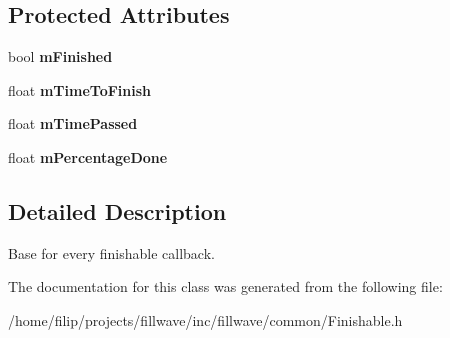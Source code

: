 \subsection*{Protected Attributes}
\begin{DoxyCompactItemize}
\item 
\mbox{\label{classflw_1_1flf_1_1Finishable_a7ece5edd33fd456e1845ca7c9e209882}} 
bool {\bfseries m\+Finished}
\item 
\mbox{\label{classflw_1_1flf_1_1Finishable_a4c1792287327a12b3089faef3bae7a4f}} 
float {\bfseries m\+Time\+To\+Finish}
\item 
\mbox{\label{classflw_1_1flf_1_1Finishable_a51e6bc00dfe9b1a7726e7f6fde2dc9ce}} 
float {\bfseries m\+Time\+Passed}
\item 
\mbox{\label{classflw_1_1flf_1_1Finishable_a8da70d226a3aa1663a328aa4eaefbd1d}} 
float {\bfseries m\+Percentage\+Done}
\end{DoxyCompactItemize}


\subsection{Detailed Description}
Base for every finishable callback. 

The documentation for this class was generated from the following file\+:\begin{DoxyCompactItemize}
\item 
/home/filip/projects/fillwave/inc/fillwave/common/Finishable.\+h\end{DoxyCompactItemize}
